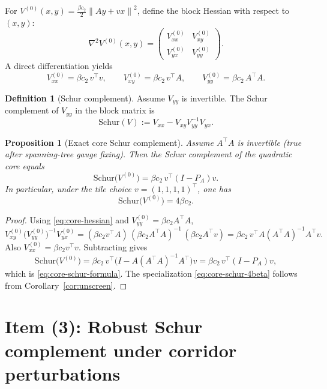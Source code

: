 \documentclass[11pt]{article}
\newtheorem{proposition}[theorem]{Proposition}
\theoremstyle{definition}
\newtheorem{definition}[theorem]{Definition}
\newcommand{\1}{\mathbf{1}}
\newcommand{\norm}[1]{\left\lVert#1\right\rVert}
\begin{document}
For $V^{(0)}(x,y)=\frac{\beta c_2}{2}\norm{Ay+vx}^2$, define the block Hessian with respect to $(x,y)$:
\[
\nabla^2 V^{(0)}(x,y)=\begin{pmatrix}
V^{(0)}_{xx} & V^{(0)}_{xy}\\
V^{(0)}_{yx} & V^{(0)}_{yy}
\end{pmatrix}.
\]
A direct differentiation yields
\begin{equation}\label{eq:core-hessian}
V^{(0)}_{xx}=\beta c_2\, v^\top v,
\qquad
V^{(0)}_{xy}=\beta c_2\, v^\top A,
\qquad
V^{(0)}_{yy}=\beta c_2\, A^\top A.
\end{equation}

\begin{definition}[Schur complement]
Assume $V_{yy}$ is invertible. The Schur complement of $V_{yy}$ in the block matrix is
\[
\mathrm{Schur}(V):=V_{xx}-V_{xy}V_{yy}^{-1}V_{yx}.
\]
\end{definition}

\begin{proposition}[Exact core Schur complement]\label{prop:core-schur}
Assume $A^\top A$ is invertible (true after spanning-tree gauge fixing). Then the Schur complement of the quadratic core equals
\begin{equation}\label{eq:core-schur-formula}
\mathrm{Schur}\big(V^{(0)}\big)
=\beta c_2\, v^\top (I-P_A) v.
\end{equation}
In particular, under the tile choice $v=(1,1,1,1)^\top$, one has
\begin{equation}\label{eq:core-schur-4beta}
\mathrm{Schur}\big(V^{(0)}\big)=4\beta c_2.
\end{equation}
\end{proposition}

\begin{proof}
Using \eqref{eq:core-hessian} and $V^{(0)}_{yy}=\beta c_2 A^\top A$,
\[
V^{(0)}_{xy}\big(V^{(0)}_{yy}\big)^{-1}V^{(0)}_{yx}
=(\beta c_2 v^\top A)\,(\beta c_2 A^\top A)^{-1}\,(\beta c_2 A^\top v)
=\beta c_2\, v^\top A(A^\top A)^{-1}A^\top v.
\]
Also $V^{(0)}_{xx}=\beta c_2 v^\top v$. Subtracting gives
\[
\mathrm{Schur}\big(V^{(0)}\big)=\beta c_2\, v^\top\Big(I-A(A^\top A)^{-1}A^\top\Big)v
=\beta c_2\, v^\top (I-P_A) v,
\]
which is \eqref{eq:core-schur-formula}. The specialization \eqref{eq:core-schur-4beta} follows from Corollary~\ref{cor:unscreen}.
\end{proof}

\section{Item (3): Robust Schur complement under corridor perturbations}
\end{document}
